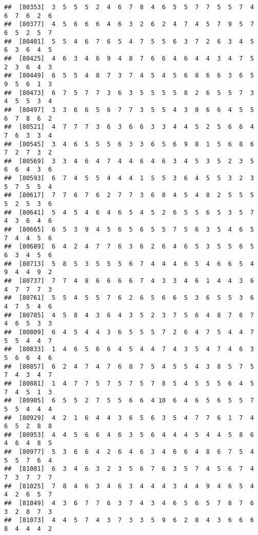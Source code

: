 \documentclass[
]{book}
\begin{document}
\begin{verbatim}
##  [80353]  3  5  5  5  2  4  6  7  8  4  6  5  5  7  7  5  5  7  4  6  7  6  2  6
##  [80377]  4  5  6  6  6  4  6  3  2  6  2  4  7  4  5  7  9  5  7  6  5  2  5  7
##  [80401]  5  5  4  6  7  6  5  4  7  5  5  6  3  7  2  6  3  4  5  6  3  6  4  5
##  [80425]  4  6  3  4  6  9  4  8  7  6  6  4  6  4  4  3  4  7  5  2  3  6  4  3
##  [80449]  6  5  5  4  8  7  3  7  4  5  4  5  6  8  6  6  3  6  5  9  5  6  1  3
##  [80473]  6  7  5  7  7  3  6  3  5  5  5  5  8  2  6  5  5  7  3  4  5  5  3  4
##  [80497]  3  3  6  6  5  6  7  7  3  5  5  4  3  8  6  6  4  5  5  6  7  8  6  2
##  [80521]  4  7  7  7  3  6  3  6  6  3  3  4  4  5  2  5  6  6  4  7  6  3  3  4
##  [80545]  3  4  6  5  5  5  6  3  3  6  5  6  9  8  1  5  6  8  6  7  2  7  3  2
##  [80569]  3  3  4  6  4  7  4  4  6  4  6  3  4  5  3  5  2  3  5  6  6  4  3  6
##  [80593]  6  7  4  5  5  4  4  4  1  5  5  3  6  4  5  5  3  2  3  5  7  5  5  4
##  [80617]  7  7  6  7  6  2  7  7  3  6  8  4  5  4  8  2  5  5  5  5  2  5  3  6
##  [80641]  5  4  5  4  6  4  6  5  4  5  2  6  5  5  6  5  3  5  7  4  3  6  4  6
##  [80665]  6  5  3  9  4  5  6  5  6  5  5  7  5  6  3  5  4  6  5  7  4  4  5  6
##  [80689]  6  4  2  4  7  7  6  3  6  2  6  4  6  5  3  5  5  6  5  6  3  4  5  6
##  [80713]  5  8  5  3  5  5  5  6  7  4  4  4  6  5  4  6  6  5  4  9  4  4  9  2
##  [80737]  7  7  4  8  6  6  6  6  7  4  3  3  4  6  1  4  4  3  6  4  7  7  7  3
##  [80761]  5  5  4  5  5  7  6  2  6  5  6  6  5  3  6  5  5  3  6  4  7  5  4  6
##  [80785]  4  5  8  4  3  6  4  3  5  2  3  7  5  6  4  8  7  6  7  4  6  5  3  3
##  [80809]  6  4  5  4  4  3  6  5  5  5  7  2  6  4  7  5  4  4  7  5  5  4  4  7
##  [80833]  1  4  6  5  6  6  4  5  4  4  7  4  3  5  4  7  4  6  3  5  6  6  4  6
##  [80857]  6  2  4  7  4  7  6  8  7  5  4  5  5  4  3  8  5  7  5  7  4  3  4  7
##  [80881]  1  4  7  7  5  7  5  7  5  7  8  5  4  5  5  5  6  4  5  7  4  5  1  3
##  [80905]  6  5  5  2  7  5  5  6  6  4 10  6  4  6  5  6  5  5  7  5  5  4  4  4
##  [80929]  4  2  1  6  4  4  3  6  5  6  3  5  4  7  7  6  1  7  4  6  5  2  8  8
##  [80953]  4  4  5  6  6  4  6  3  5  6  4  4  4  5  4  4  5  8  6  4  6  4  8  5
##  [80977]  5  3  6  6  4  2  6  4  6  3  4  6  6  4  8  6  7  5  4  5  5  7  6  4
##  [81001]  6  3  4  6  3  2  3  5  6  7  6  3  5  7  4  5  6  7  4  7  3  7  7  7
##  [81025]  7  8  4  6  3  4  6  3  4  4  4  3  4  4  9  4  6  5  4  4  2  6  5  7
##  [81049]  4  3  6  7  7  6  3  7  4  3  4  6  5  6  5  7  8  7  6  3  2  8  7  3
##  [81073]  4  4  5  7  4  3  7  3  3  5  9  6  2  8  4  3  6  6  6  8  4  4  4  2

\end{verbatim}
\end{document}
